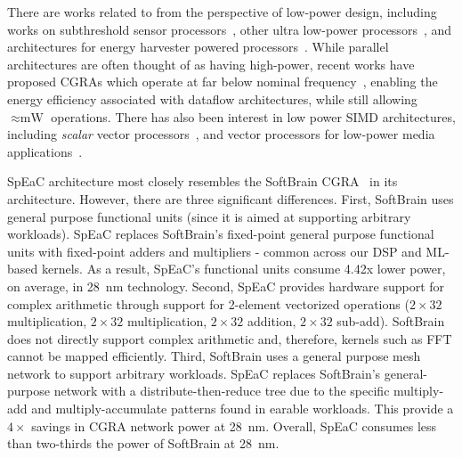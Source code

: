 There are works related to \arch{} from the perspective of low-power
design, including works on subthreshold sensor
processors~\cite{nazhandali2005energy}, other ultra low-power processors~\cite{lee2012circuit},
and architectures for energy harvester powered processors~\cite{kim2022sic}.
While parallel architectures are often thought of as having high-power, recent
works have proposed CGRAs which operate at far below nominal
frequency~\cite{gobieski2021snafu, das2017142mops}, enabling the energy
efficiency associated with dataflow architectures, while still allowing
\(\approx\si{\milli\watt}\) operations. There has also been interest in low
power SIMD architectures, including \textit{scalar} vector
processors~\cite{gobieski2019manic}, and vector processors for low-power media
applications~\cite{gebis2004viram1, nam2007low}.


SpEaC architecture
most closely resembles the SoftBrain CGRA~\cite{nowatzki2017stream} in its
architecture.  However, there are three  significant differences.
First, SoftBrain uses general purpose functional units (since it is aimed at
supporting arbitrary workloads). SpEaC replaces SoftBrain's fixed-point general
purpose functional units with fixed-point adders and multipliers - common
across our DSP and ML-based kernels.
As a result, SpEaC's functional units consume 4.42x lower power, on average,
in \SI{28}{\nano\meter} technology.
Second, SpEaC provides hardware support for complex arithmetic through support
for 2-element vectorized operations ($2\times 32$ multiplication, $2\times 32$
multiplication, $2\times 32$ addition, $2\times 32$ sub-add). SoftBrain
does not directly support complex arithmetic and, therefore, kernels such as
FFT cannot be mapped efficiently.
Third, SoftBrain uses a general purpose mesh network to support arbitrary
workloads. SpEaC replaces SoftBrain's general-purpose network with a
distribute-then-reduce tree
due to the specific multiply-add and multiply-accumulate patterns found in
earable workloads.
This provide a $4\times$ savings in CGRA network power at \SI{28}{\nano\meter}.
Overall, SpEaC consumes less than two-thirds the power of SoftBrain at
\SI{28}{\nm}.


